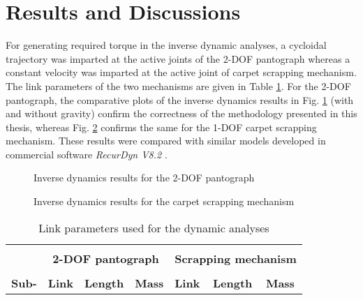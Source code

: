 {\section{Results and Discussions}
\label{c5resanddisc}
For generating required torque in the inverse dynamic analyses, a cycloidal trajectory was imparted at the active joints of the 2-DOF pantograph whereas a constant velocity was imparted at the active joint of carpet scrapping mechanism. The link parameters of the two mechanisms are given in Table \ref{tab1:parameters}. For the 2-DOF pantograph, the comparative plots of the inverse dynamics results in Fig. \ref{fig:c5panto_invdyn} (with and without gravity) confirm the correctness of the methodology presented in this thesis, whereas Fig. \ref{fig:c5cs_invdyn} confirms the same for the 1-DOF carpet scrapping mechanism. These results were compared with similar models developed in commercial software \textit{RecurDyn V8.2} \citep{recurdyn}.
\begin{figure}[t!]
		\begin{center}
		\end{center}
		\caption{Inverse dynamics results for the 2-DOF pantograph}
		\label{fig:c5panto_invdyn}
\end{figure}
\begin{figure}[t!] 
		\begin{center}
		\end{center}
		\caption{Inverse dynamics results for the carpet scrapping mechanism}
		\label{fig:c5cs_invdyn}
\end{figure}
\begin{table}[t!]
		\centering
		\caption{Link parameters used for the dynamic analyses}
		\label{tab1:parameters} %
		\begin{tabular}{l|lll|lll}
			\hline
			&&&&&&\\
			& \multicolumn{3}{|c}{\textbf{2-DOF pantograph}} & \multicolumn{3}{|c}{\textbf{Scrapping mechanism}}\\
			\hline 
			&&&&&&\\
			\textbf{Sub-}&\textbf{Link}&\textbf{Length}&\textbf{Mass}&\textbf{Link}&\textbf{Length}&\textbf{Mass} \\

\end{tabular}
\end{table}}
